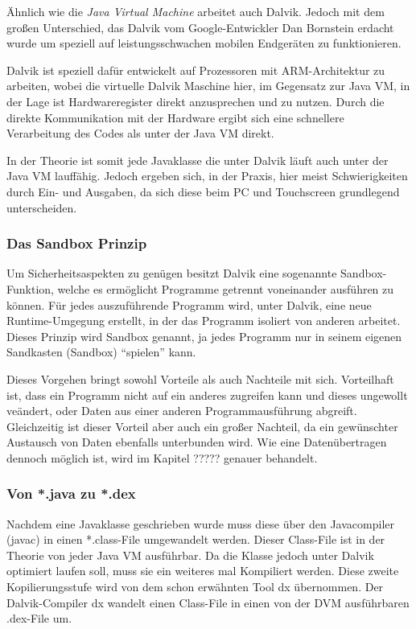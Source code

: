 \"Ahnlich wie die \emph{Java Virtual Machine} arbeitet auch Dalvik. Jedoch mit dem gro\ss{}en Unterschied, das Dalvik vom Google-Entwickler Dan Bornstein erdacht wurde um speziell auf leistungsschwachen mobilen Endger\"aten zu funktionieren.

Dalvik ist speziell daf\"ur entwickelt auf Prozessoren mit ARM-Architektur zu arbeiten, wobei die virtuelle Dalvik Maschine hier, im Gegensatz zur Java VM, in der Lage ist Hardwareregister direkt anzusprechen und zu nutzen. Durch die direkte Kommunikation mit der Hardware ergibt sich eine schnellere Verarbeitung des Codes als unter der Java VM direkt.

In der Theorie ist somit jede Javaklasse die unter Dalvik l\"auft auch unter der Java VM lauff\"ahig. Jedoch ergeben sich, in der Praxis, hier meist Schwierigkeiten durch Ein- und Ausgaben, da sich diese beim PC und Touchscreen grundlegend unterscheiden.

\subsubsection{Das Sandbox Prinzip}
Um Sicherheitsaspekten zu gen\"ugen besitzt Dalvik eine sogenannte Sandbox-Funktion, welche es erm\"oglicht Programme getrennt voneinander ausf\"uhren zu k\"onnen. F\"ur jedes auszuf\"uhrende Programm wird, unter Dalvik, eine neue Runtime-Umgegung erstellt, in der das Programm isoliert von anderen arbeitet. 
Dieses Prinzip wird Sandbox genannt, ja jedes Programm nur in seinem eigenen Sandkasten (Sandbox) "`spielen"' kann.

Dieses Vorgehen bringt sowohl Vorteile als auch Nachteile mit sich. Vorteilhaft ist, dass ein Programm nicht auf ein anderes zugreifen kann und dieses ungewollt ve\"andert, oder Daten aus einer anderen Programmausf\"uhrung abgreift. Gleichzeitig ist dieser Vorteil aber auch ein gro\ss{}er Nachteil, da ein gew\"unschter Austausch von Daten ebenfalls unterbunden wird.
Wie eine Daten\"ubertragen dennoch m\"oglich ist, wird im Kapitel ????? genauer behandelt.

\subsubsection{Von *.java zu *.dex}
Nachdem eine Javaklasse geschrieben wurde muss diese \"uber den Javacompiler (javac) in einen *.class-File umgewandelt werden. Dieser Class-File ist in der Theorie von jeder Java VM ausf\"uhrbar. Da die Klasse jedoch unter Dalvik optimiert laufen soll, muss sie ein weiteres mal Kompiliert werden. Diese zweite Kopilierungsstufe wird von dem schon erw\"ahnten Tool dx \"ubernommen. 
Der Dalvik-Compiler dx wandelt einen Class-File in einen von der \ac{DVM} ausf\"uhrbaren .dex-File um.

